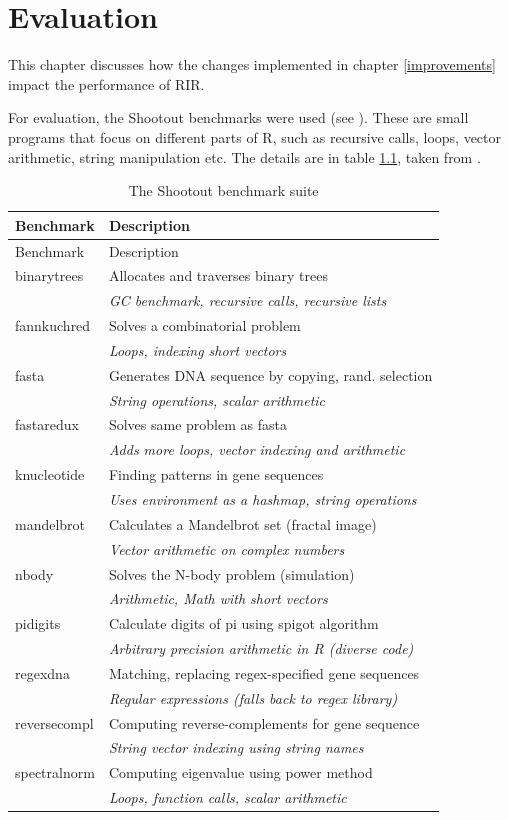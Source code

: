 
\chapter{Evaluation\label{evaluation}}

This chapter discusses how the changes implemented in chapter \ref{improvements} impact the performance of RIR.

For evaluation, the Shootout benchmarks were used (see \autocite{fastr, shootout}). These are small programs that focus on different parts of R, such as recursive calls, loops, vector arithmetic, string manipulation etc. The details are in table \ref{tab:shootout}, taken from \autocite{fastr}.

\begin{longtable}[c]{@{}ll@{}}
\caption{The Shootout benchmark suite\label{tab:shootout}} \tabularnewline
\toprule
Benchmark & Description \tabularnewline
\midrule
\endfirsthead
\toprule
Benchmark & Description \tabularnewline
\midrule
\endhead
binarytrees & Allocates and traverses binary trees \tabularnewline
& \emph{GC benchmark, recursive calls, recursive lists} \tabularnewline
fannkuchred & Solves a combinatorial problem \tabularnewline
& \emph{Loops, indexing short vectors} \tabularnewline
fasta & Generates DNA sequence by copying, rand. selection \tabularnewline
& \emph{String operations, scalar arithmetic} \tabularnewline
fastaredux & Solves same problem as fasta \tabularnewline
& \emph{Adds more loops, vector indexing and arithmetic} \tabularnewline
knucleotide & Finding patterns in gene sequences \tabularnewline
& \emph{Uses environment as a hashmap, string operations} \tabularnewline
mandelbrot & Calculates a Mandelbrot set (fractal image) \tabularnewline
& \emph{Vector arithmetic on complex numbers} \tabularnewline
nbody & Solves the N-body problem (simulation) \tabularnewline
& \emph{Arithmetic, Math with short vectors} \tabularnewline
pidigits & Calculate digits of pi using spigot algorithm \tabularnewline
& \emph{Arbitrary precision arithmetic in R (diverse code)} \tabularnewline
regexdna & Matching, replacing regex-specified gene sequences \tabularnewline
& \emph{Regular expressions (falls back to regex library)} \tabularnewline
reversecompl & Computing reverse-complements for gene sequence \tabularnewline
& \emph{String vector indexing using string names} \tabularnewline
spectralnorm & Computing eigenvalue using power method \tabularnewline
& \emph{Loops, function calls, scalar arithmetic} \tabularnewline
\bottomrule
\end{longtable}

